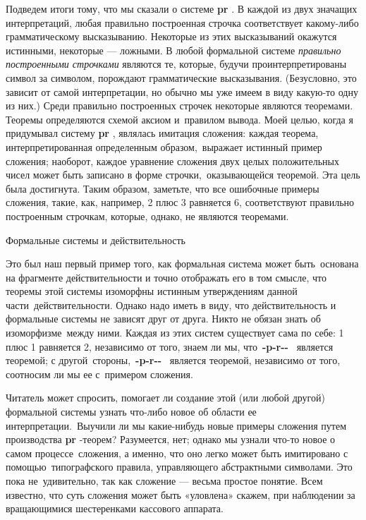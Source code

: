 Подведем итоги тому, что мы сказали о системе \textbf{pr} . В каждой из двух значащих интерпретаций, любая правильно построенная строчка соответствует какому-либо грамматическому высказыванию. Некоторые из этих высказываний окажутся истинными, некоторые --- ложными. В любой формальной системе \emph{правильно построенными строчками} являются те, которые, будучи проинтерпретированы символ за символом, порождают грамматические высказывания. (Безусловно, это зависит от самой интерпретации, но обычно мы уже имеем в виду какую-то одну из них.) Среди правильно построенных строчек некоторые являются теоремами. Теоремы определяются схемой аксиом и~правилом вывода. Моей целью, когда я придумывал систему \textbf{pr} , являлась имитация сложения: каждая теорема, интерпретированная определенным образом,~выражает истинный пример сложения; наоборот, каждое уравнение сложения двух целых положительных чисел может быть записано в форме строчки,~оказывающейся теоремой. Эта цель была достигнута. Таким образом, заметьте, что все ошибочные примеры сложения, такие, как, например, 2 плюс 3 равняется 6, соответствуют правильно построенным строчкам, которые, однако, не являются теоремами.

Формальные системы и действительность

Это был наш первый пример того, как формальная система может быть~основана на фрагменте действительности и точно отображать его в том смысле, что теоремы этой системы изоморфны истинным утверждениям данной части~действительности. Однако надо иметь в виду, что действительность и формальные системы не зависят друг от друга. Никто не обязан знать об изоморфизме~между ними. Каждая из этих систем существует сама по себе: 1 плюс 1 равняется 2, независимо от того, знаем ли мы, что~\textbf{-p-r-\/-} ~является теоремой; с другой~стороны,~\textbf{-p-r-\/-} ~является теоремой, независимо от того, соотносим ли мы ее с~примером сложения.

Читатель может спросить, помогает ли создание этой (или любой другой) формальной системы узнать что-либо новое об области ее интерпретации.~Выучили ли мы какие-нибудь новые примеры сложения путем производства \textbf{pr} -теорем? Разумеется, нет; однако мы узнали что-то новое о самом процессе~сложения, а именно, что оно легко может быть имитировано с помощью~типографского правила, управляющего абстрактными символами. Это пока не~удивительно, так как сложение --- весьма простое понятие. Всем известно, что суть сложения может быть «уловлена» скажем, при наблюдении за вращающимися шестеренками кассового аппарата.

